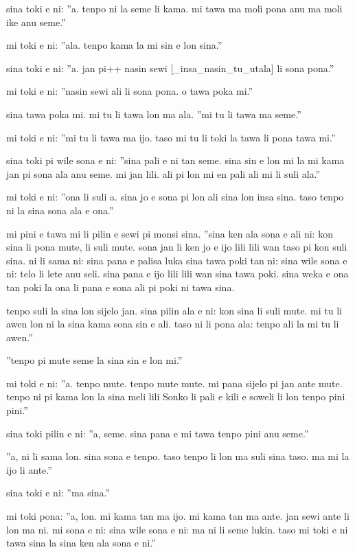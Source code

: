 \documentclass{article}
\begin{document}
sina toki e ni: ''a. tenpo ni la seme li kama. mi tawa ma moli pona anu ma moli ike anu seme.''

mi toki e ni: ''ala. tenpo kama la mi sin e lon sina.''

sina toki e ni: ''a. jan pi++ nasin sewi {[}\_insa\_nasin\_tu\_utala{]} li sona pona.''

mi toki e ni: ''nasin sewi ali li sona pona. o tawa poka mi.''

sina tawa poka mi. mi tu li tawa lon ma ala. ''mi tu li tawa ma seme.''

mi toki e ni: ''mi tu li tawa ma ijo. taso mi tu li toki la tawa li pona tawa mi.''

sina toki pi wile sona e ni: ''sina pali e ni tan seme. sina sin e lon mi la mi kama jan pi sona ala anu seme. mi jan lili. ali pi lon mi en pali ali mi li suli ala.''

mi toki e ni: ''ona li suli a. sina jo e sona pi lon ali sina lon insa sina. taso tenpo ni la sina sona ala e ona.''

mi pini e tawa mi li pilin e sewi pi monsi sina. ''sina ken ala sona e ali ni: kon sina li pona mute, li suli mute. sona jan li ken jo e ijo lili lili wan taso pi kon suli sina. ni li sama ni: sina pana e palisa luka sina tawa poki tan ni: sina wile sona e ni: telo li lete anu seli. sina pana e ijo lili lili wan sina tawa poki. sina weka e ona tan poki la ona li pana e sona ali pi poki ni tawa sina.

tenpo suli la sina lon sijelo jan. sina pilin ala e ni: kon sina li suli mute. mi tu li awen lon ni la sina kama sona sin e ali. taso ni li pona ala: tenpo ali la mi tu li awen.''

''tenpo pi mute seme la sina sin e lon mi.''

mi toki e ni: ''a. tenpo mute. tenpo mute mute. mi pana sijelo pi jan ante mute. tenpo ni pi kama lon la sina meli lili Sonko li pali e kili e soweli li lon tenpo pini pini.''

sina toki pilin e ni: ''a, seme. sina pana e mi tawa tenpo pini anu seme.''

''a, ni li sama lon. sina sona e tenpo. taso tenpo li lon ma suli sina taso. ma mi la ijo li ante.''

sina toki e ni: ''ma sina.''

mi toki pona: ''a, lon. mi kama tan ma ijo. mi kama tan ma ante. jan sewi ante li lon ma ni. mi sona e ni: sina wile sona e ni: ma ni li seme lukin. taso mi toki e ni tawa sina la sina ken ala sona e ni.''
\end{document}
